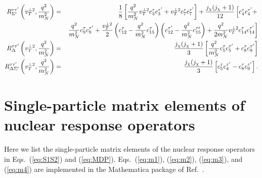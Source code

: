 \documentclass[11pt,a4paper]{article}
\begin{document}
\begin{eqnarray}
    R_{\Sigma^\prime}^{\tau \tau^\prime}\left(v_T^{\perp 2}, {q^2 \over m_N^2}\right)  &=&{1 \over 8} \left[ {q^2 \over  m_N^2}  v_T^{\perp 2} c_{3}^\tau  c_{3}^{\tau^\prime } + v_T^{\perp 2}  c_{7}^\tau  c_{7}^{\tau^\prime }  \right]
       + {j_\chi (j_\chi+1) \over 12} \left[ c_4^\tau c_4^{\tau^\prime} +  \right.\nonumber \\
       &&\left. {q^2 \over m_N^2} c_9^\tau c_9^{\tau^\prime }+{v_T^{\perp 2} \over 2} \left(c_{12}^\tau-{q^2 \over m_N^2}c_{15}^\tau \right) \left( c_{12}^{\tau^\prime }-{q^2 \over m_N^2}c_{15}^{\tau \prime} \right) +{q^2 \over 2 m_N^2} v_T^{\perp 2}  c_{14}^\tau c_{14}^{\tau^\prime } \right] \nonumber \\
     R_{\Delta}^{\tau \tau^\prime}\left(v_T^{\perp 2}, {q^2 \over m_N^2}\right)&=&  {j_\chi (j_\chi+1) \over 3} \left[ {q^2 \over m_N^2} c_{5}^\tau c_{5}^{\tau^\prime }+ c_{8}^\tau c_{8}^{\tau^\prime } \right] \nonumber \\
 R_{\Delta \Sigma^\prime}^{\tau \tau^\prime}\left(v_T^{\perp 2}, {q^2 \over m_N^2}\right)&=& {j_\chi (j_\chi+1) \over 3} \left[c_{5}^\tau c_{4}^{\tau^\prime }-c_8^\tau c_9^{\tau^\prime} \right].
\end{eqnarray}


\section{Single-particle matrix elements of nuclear response operators}
\label{sec:appME}
Here we list the single-particle matrix elements of the nuclear response operators in Eqs.~(\ref{eq:S1S2}) and (\ref{eq:MDP}). Eqs.~(\ref{eq:m1}), (\ref{eq:m2}), (\ref{eq:m3}), and (\ref{eq:m4}) are implemented in the {\sffamily Mathematica} package of Ref.~\cite{Anand:2013yka}. 
\end{document}
